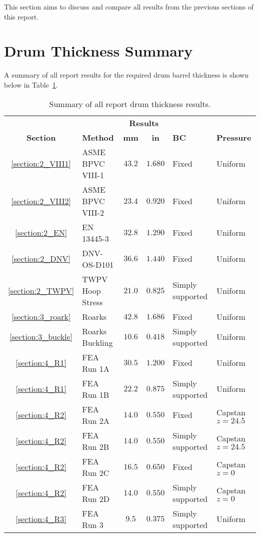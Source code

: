
This section aims to discuss and compare all results from the previous sections of this report.

\section{Drum Thickness Summary}

A summary of all report results for the required drum barrel thickness is shown below in Table~\ref{table:5_sum}.

\begin{table}[H]
  \centering
  \caption{Summary of all report drum thickness results.}
    \begin{tabular}{clccll}
          &       & \multicolumn{2}{c}{\textbf{Results}} &       &  \\
    \textbf{Section} & \textbf{Method} & \textbf{mm} & \textbf{in} & \textbf{BC} & \textbf{Pressure } \\
    \midrule
          \ref{section:2_VIII1}& ASME BPVC VIII-1 & $43.2$ & $1.680$ & Fixed & Uniform \\
          \ref{section:2_VIII2}& ASME BPVC VIII-2 & $23.4$ & $0.920$ & Fixed & Uniform \\
          \ref{section:2_EN}& EN 13445-3 & $32.8$ & $1.290$ & Fixed & Uniform \\
          \ref{section:2_DNV}& DNV-OS-D101 & $36.6$ & $1.440$ & Fixed & Uniform \\
          \ref{section:2_TWPV}& TWPV Hoop Stress & $21.0$ & $0.825$ & Simply supported & Uniform \\
          \ref{section:3_roark}& Roarks & $42.8$ & $1.686$ & Fixed & Uniform \\
          \ref{section:3_buckle}& Roarks Buckling & $10.6$ & $0.418$ & Simply supported & Uniform \\
          \ref{section:4_R1}& FEA Run 1A & $30.5$ & $1.200$ & Fixed & Uniform \\
          \ref{section:4_R1}& FEA Run 1B & $22.2$ & $0.875$ & Simply supported & Uniform \\
          \ref{section:4_R2}& FEA Run 2A & $14.0$ & $0.550$ & Fixed & Capstan $z=24.5$ \\
          \ref{section:4_R2}& FEA Run 2B & $14.0$ & $0.550$ & Simply supported & Capstan $z=24.5$\\
          \ref{section:4_R2}& FEA Run 2C & $16.5$ & $0.650$ & Fixed & Capstan $z=0$ \\
          \ref{section:4_R2}& FEA Run 2D & $14.0$ & $0.550$ & Simply supported & Capstan $z=0$  \\
          \ref{section:4_R3}& FEA Run 3 & $9.5$ & $0.375$ & Simply supported & Uniform \\
    \end{tabular}
  \label{table:5_sum}
\end{table}%

